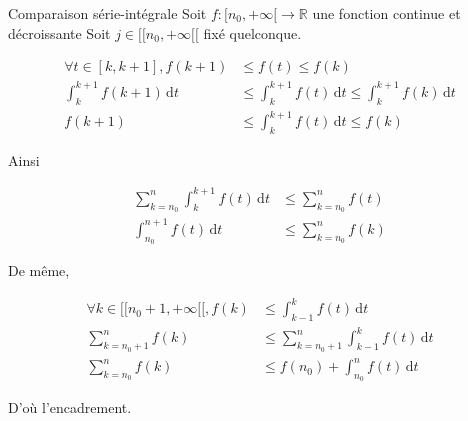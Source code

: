 \documentclass{article}
\begin{document}
\begin{question_kholle}{Comparaison série-intégrale}
    Soit $f:[n_{0}, +\infty[ \to \mathbb{R}$ une fonction continue et décroissante
    Soit $j \in [ \! [ n_{0}, +\infty [\![$ fixé quelconque.
    
    \begin{align*}
        \forall t \in [k, k+1], f(k+1) &\leqslant f(t) \leqslant f(k) \\
        \int_{k}^{k+1} f(k+1) \, \mathrm dt &\leqslant \int_{k}^{k+1} f(t) \, \mathrm dt \leqslant \int_{k}^{k+1}  f(k) \, \mathrm dt  \\
        f(k+1) & \leqslant \int_{k}^{k+1} f(t) \, \mathrm dt \leqslant f(k)
    \end{align*}
    
    Ainsi
    
    \begin{align*}
        \sum_{k=n_{0}}^{n}\int_{k}^{k+1}f(t)  \, \mathrm dt  & \leqslant \sum_{k=n_{0}}^{n}f(t) \\
        \int_{n_{0}}^{n+1} f(t) \, \mathrm dt & \leqslant \sum_{k=n_{0}}^{n}f(k)
    \end{align*}
    
    
    De même,
    
    \begin{align*}
        \forall k \in [ \! [ n_{0}+1 , +\infty[ \![, f(k) & \leqslant\int_{k-1}^{k} f(t) \, \mathrm dt  \\
        \sum_{k=n_{0}+1}^{n}f(k)  & \leqslant \sum_{k=n_{0}+1}^{n}\int_{k-1}^{k} f(t) \, \mathrm dt \\
        \sum_{k=n_{0}}^{n} f(k)&\leqslant f(n_{0})+ \int_{n_{0}}^{n} f(t) \, \mathrm dt 
    \end{align*}
    
    D'où l'encadrement.
\end{question_kholle}
\end{document}
